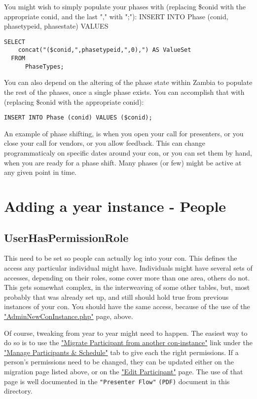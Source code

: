 \documentclass[captions=tablesignature]{scrartcl}
\begin{document}
You might wish to simply populate your phases with (replacing
\$conid with the appropriate conid, and the last "," with ";"):
INSERT INTO Phase (conid, phasetypeid, phasestate) VALUES
\begin{verbatim}
SELECT
    concat("($conid,",phasetypeid,",0),") AS ValueSet
  FROM
      PhaseTypes;
\end{verbatim}
You can also depend on the altering of the phase state within
Zambia to populate the rest of the phases, once a single phase
exists. You can accomplish that with (replacing \$conid with the
appropriate conid):
\begin{verbatim}
INSERT INTO Phase (conid) VALUES ($conid);
\end{verbatim}

An example of phase shifting, is when you open your call for
presenters, or you close your call for vendors, or you allow
feedback.  This can change programmaticaly on specific dates around
your con, or you can set them by hand, when you are ready for a
phase shift.  Many phases (or few) might be active at any given
point in time.

\section{Adding a year instance - People}
\label{sec-12}
\subsection{UserHasPermissionRole}
\label{sec-12-1}

This need to be set so people can actually log into your con.  This
defines the access any particular individual might have.
Individuals might have several sets of accesses, depending on their
roles, some cover more than one area, others do not.  This gets
somewhat complex, in the interweaving of some other tables, but,
most probably that was already set up, and still should hold true from
previous instances of your con.  You should have the same access,
because of the use of the \href{../webpages/AdminNewConInstance.php}{"AdminNewConInstance.php"} page, above.

Of course, tweaking from year to year might need to happen.  The
easiest way to do so is to use the 
\href{../webpages/StaffEditCreateParticipant.php?action=migrate}{"Migrate Participant from another con-instance"} link under the
\href{../webpages/StaffManageParticipants.php}{"Manage Participants \& Schedule"} tab  
to give each the right permissions. If a person's permissions need
to be changed, they can be updated either on the migration page
listed above, or on the \href{../webpages/StaffEditCreateParticipant.php?action=edit}{"Edit Participant"} page. The use of that
page is well documented in the \texttt{"Presenter Flow"} \texttt{(PDF)} document in
this directory.
\end{document}
